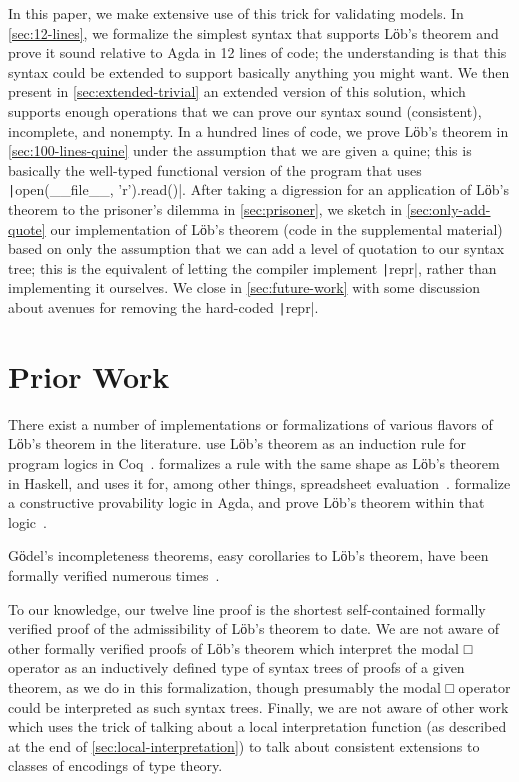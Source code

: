  In this paper, we make extensive use of this trick for validating
 models.  In \autoref{sec:12-lines}, we formalize the simplest syntax
 that supports Lӧb's theorem and prove it sound relative to Agda in 12
 lines of code; the understanding is that this syntax could be
 extended to support basically anything you might want.  We then
 present in \autoref{sec:extended-trivial} an extended version of this
 solution, which supports enough operations that we can prove our
 syntax sound (consistent), incomplete, and nonempty.  In a hundred
 lines of code, we prove Lӧb's theorem in
 \autoref{sec:100-lines-quine} under the assumption that we are given
 a quine; this is basically the well-typed functional version of the
 program that uses \texttt|open(__file__, 'r').read()|.
 After taking a digression for an application of Lӧb's theorem to the
 prisoner's dilemma in \autoref{sec:prisoner}, we sketch in
 \autoref{sec:only-add-quote} our implementation of Lӧb's theorem
 (code in the supplemental material) based on only the assumption that
 we can add a level of quotation to our syntax tree; this is the
 equivalent of letting the compiler implement
 \texttt|repr|, rather than implementing it ourselves.  We
 close in \autoref{sec:future-work} with some discussion about avenues
 for removing the hard-coded \texttt|repr|.

\section{Prior Work} \label{sec:prior-work-and-new}

 There exist a number of implementations or formalizations of various
 flavors of Lӧb's theorem in the literature.
  use Lӧb's theorem as an induction rule for
 program logics in Coq~\cite{appel2007very}.
  formalizes a rule
 with the same shape as Lӧb's theorem in Haskell, and uses it for,
 among other things, spreadsheet
 evaluation~\cite{piponi-from-l-theorem-to-spreadsheet}.
  formalize a constructive provability
 logic in Agda, and prove Lӧb's theorem within that
 logic~\cite{SimmonsToninho2012}.

 Gӧdel's incompleteness theorems, easy corollaries to Lӧb's theorem,
 have been formally verified numerous
 times~\cite{Shankar:1986:PM:913294,shankar1997metamathematics,DBLP:journals/corr/abs-cs-0505034,paulson2015mechanised}.

 To our knowledge, our twelve line proof is the shortest
 self-contained formally verified proof of the admissibility of Lӧb's
 theorem to date.  We are not aware of other formally verified proofs
 of Lӧb's theorem which interpret the modal □ operator as an
 inductively defined type of syntax trees of proofs of a given
 theorem, as we do in this formalization, though presumably the modal
 □ operator \citeauthor{SimmonsToninho2012} could be interpreted as
 such syntax trees.  Finally, we are not aware of other work which
 uses the trick of talking about a local interpretation function (as
 described at the end of \autoref{sec:local-interpretation}) to talk
 about consistent extensions to classes of encodings of type theory.

